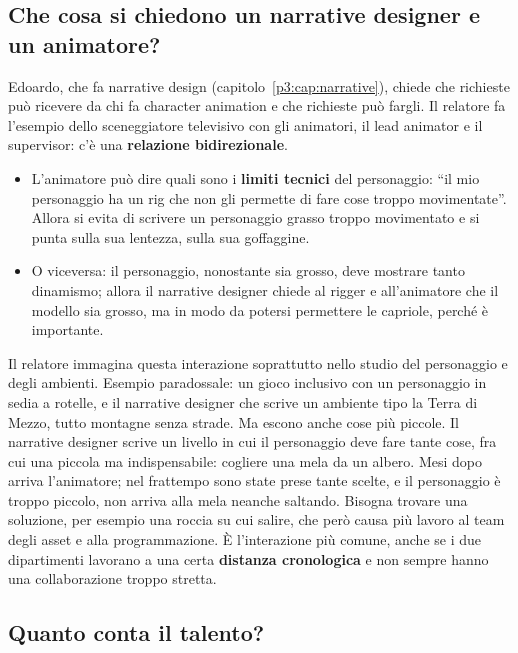 \subsection{Che cosa si chiedono un narrative designer e un animatore?}

Edoardo, che fa narrative design (capitolo~\ref{p3:cap:narrative}), chiede che
richieste può ricevere da chi fa character animation e che richieste può
fargli. Il relatore fa l'esempio dello sceneggiatore televisivo con gli
animatori, il lead animator e il supervisor: c'è una \textbf{relazione
bidirezionale}.
\begin{itemize}
  \item L'animatore può dire quali sono i \textbf{limiti tecnici} del
        personaggio: ``il mio personaggio ha un rig che non gli permette di
        fare cose troppo movimentate''. Allora si evita di scrivere un
        personaggio grasso troppo movimentato e si punta sulla sua lentezza,
        sulla sua goffaggine.
  \item O viceversa: il personaggio, nonostante sia grosso, deve mostrare
        tanto dinamismo; allora il narrative designer chiede al rigger e
        all'animatore che il modello sia grosso, ma in modo da potersi
        permettere le capriole, perché è importante.
\end{itemize}
Il relatore immagina questa interazione soprattutto nello studio del
personaggio e degli ambienti. Esempio paradossale: un gioco inclusivo con un
personaggio in sedia a rotelle, e il narrative designer che scrive un
ambiente tipo la Terra di Mezzo, tutto montagne senza strade. Ma escono anche
cose più piccole. Il narrative designer scrive un livello in cui il
personaggio deve fare tante cose, fra cui una piccola ma indispensabile:
cogliere una mela da un albero. Mesi dopo arriva l'animatore; nel frattempo
sono state prese tante scelte, e il personaggio è troppo piccolo, non arriva
alla mela neanche saltando. Bisogna trovare una soluzione, per esempio una
roccia su cui salire, che però causa più lavoro al team degli asset e alla
programmazione. È l'interazione più comune, anche se i due dipartimenti
lavorano a una certa \textbf{distanza cronologica} e non sempre hanno una
collaborazione troppo stretta.

\subsection{Quanto conta il talento?}

